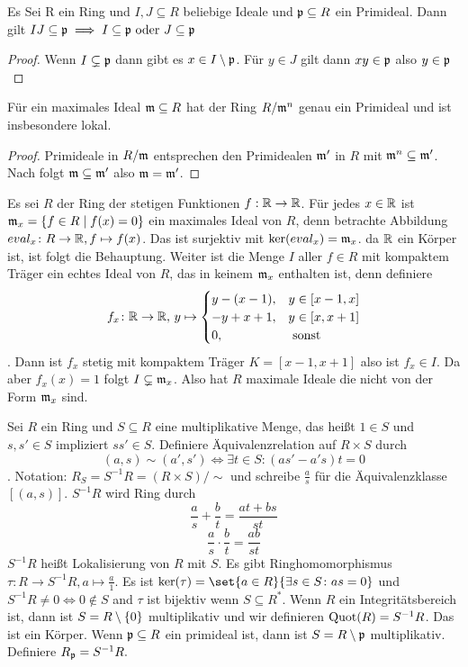 \begin{Lemma}\label{Lem:PrimidealEig}
    Es Sei R ein Ring und \(I,J\subseteq R\) beliebige Ideale und \(\mathfrak{p}\subseteq R\) ein Primideal. Dann gilt 
    \(IJ\subseteq \mathfrak{p}\implies I\subseteq\mathfrak{p} \text{ oder } J\subseteq\mathfrak{p}\)
\end{Lemma}
\begin{proof}
    Wenn \(I\subsetneq \mathfrak{p}\) dann gibt es \(x\in I\setminus\mathfrak{p}\). Für \(y\in J\) gilt dann \(xy\in\mathfrak{p}\) also \(y\in\mathfrak{p}\)
\end{proof}
\begin{Kor}
    Für ein maximales Ideal \(\mathfrak{m}\subseteq R\) hat der Ring \(R/\mathfrak{m}^n\) genau ein Primideal und ist insbesondere lokal.
\end{Kor}
\begin{proof}
    Primideale in \(R/\mathfrak{m}\) entsprechen den Primidealen \(\mathfrak{m}'\) in \(R\) mit \(\mathfrak{m}^n\subseteq \mathfrak{m}'\). Nach  folgt \(\mathfrak{m}\subseteq \mathfrak{m}'\) also \(\mathfrak{m}=\mathfrak{m}'\). 
\end{proof}
\begin{Bsp}
    Es sei \(R\) der Ring der stetigen Funktionen \(f:\mathbb{R}\to \mathbb{R}\). Für jedes \(x\in \mathbb{R}\) ist \(\mathfrak{m}_x=\{f\in R\mid f(x)=0\}\) ein maximales Ideal von \(R\), denn betrachte Abbildung \(eval_x\colon R\to \mathbb{R}, f\mapsto f(x)\). Das ist surjektiv mit \(\ker(eval_x)=\mathfrak{m}_x\). da \(\mathbb{R}\) ein Körper ist, ist folgt die Behauptung.
    Weiter ist die Menge \(I\) aller \(f\in R\) mit kompaktem Träger ein echtes Ideal von \(R\), das in keinem \(\mathfrak{m}_x\) enthalten ist, denn definiere \[f_x\colon \mathbb{R}\to \mathbb{R},\, y\mapsto \begin{cases}
        y-(x-1), & y\in[x-1,x]\\
        -y+x+1, & y\in [x,x+1]\\
        0, & \text{ sonst }
    \end{cases}\]. Dann ist \(f_x\) stetig mit kompaktem Träger \(K=[x-1,x+1]\) also 
    ist \(f_x\in I\). Da aber \(f_x(x)=1\) folgt \(I\subsetneq \mathfrak{m}_x\). 
    Also hat \(R\) maximale Ideale die nicht von der Form \(\mathfrak{m}_x\) sind.
\end{Bsp}
\begin{Def}
    Sei \(R\) ein Ring und \(S\subseteq R\) eine multiplikative Menge, das heißt \(1\in S\) und \(s,s'\in S\) impliziert \(ss'\in S\).
    Definiere Äquivalenzrelation auf \(R\times S\) durch \[(a,s)\sim (a',s')\iff \exists t\in S\colon (as'-a's)t=0\]. Notation: \(R_S=S^{-1}R=(R\times S)/\sim\) und schreibe \(\frac a s\) für die Äquivalenzklasse \([(a,s)]\).
    \(S^{-1}R\) wird Ring durch 
    \[\frac a s+\frac b t=\frac{at+bs}{st}\]
    \[\frac a s\cdot \frac b t=\frac{ab}{st}\]
    \(S^{-1}R\) heißt Lokalisierung von \(R\) mit \(S\).
    Es gibt Ringhomomorphismus \(\tau:R\to S^{-1}R,a\mapsto \frac a 1\).
    Es ist \(\ker(\tau)=\set{ a\in R}{\exists s\in S\colon as=0}\) und \(S^{-1}R\neq 0 \iff 0\not\in S\) and \(\tau \) ist bijektiv wenn \(S\subseteq R^*\).
    Wenn \(R\) ein Integritätsbereich ist, dann ist \(S=R\setminus\{0\}\) multiplikativ und wir definieren \(\operatorname{Quot}(R)=S^{-1}R\). Das ist ein Körper.
    Wenn \(\mathfrak{p}\subseteq R\) ein primideal ist, dann ist \(S=R\setminus\mathfrak{p}\) multiplikativ. Definiere \(R_{\mathfrak{p}}=S^{-1}R.\)
\end{Def}

